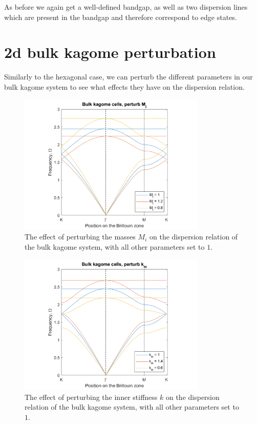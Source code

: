 As before we again get a well-defined bandgap, as well as two dispersion lines
which are present in the bandgap and therefore correspond to edge states.

\section{2d bulk kagome perturbation}
\label{kagomeperturb}

Similarly to the hexagonal case, we can perturb the different parameters in our
bulk kagome system to see what effects they have on the dispersion relation.

\begin{figure}[!h]
\centering
\includegraphics[width=0.8\textwidth]{imgs/kagomeperturbM.png}
\caption{\label{fig:kagomeM} The effect of perturbing the masses $M_i$ on the
  dispersion relation of the bulk kagome system, with all other parameters set
  to $1$.}
\end{figure}

\begin{figure}[!h]
\centering
\includegraphics[width=0.8\textwidth]{imgs/kagomeperturbk.png}
\caption{\label{fig:kagomek} The effect of perturbing the inner stiffness $k$
  on the dispersion relation of the bulk kagome system, with all other
  parameters set to $1$.}
\end{figure}


